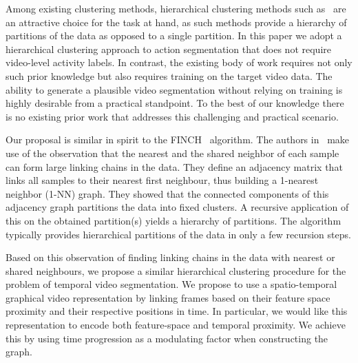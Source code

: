 \documentclass[10pt,twocolumn,letterpaper]{article}
\begin{document}
Among existing clustering methods, hierarchical clustering methods such as~\cite{finch} are an attractive choice for the task at hand, as such methods provide a hierarchy of partitions of the data as opposed to a single partition. In this paper we adopt a hierarchical clustering approach to action segmentation that does not require video-level activity labels.
In contrast, the existing body of work requires not only such prior knowledge but also requires training on the target video data.
The ability to generate a plausible video segmentation without relying on training is highly desirable from a practical standpoint.
To the best of our knowledge there is no existing prior work that addresses this challenging and practical scenario.
\begin{table}[t!]
\centering
{}
\caption{Simple clustering with Kmeans or FINCH is competitive with the best reported weakly or unsupervised methods. \label{table:baseclustering}}
\vspace{-0.3cm}
\end{table}

Our proposal is similar in spirit to the FINCH~\cite{finch} algorithm. The authors in~\cite{finch} make use of the observation that the nearest and the shared neighbor of each sample can form large linking chains in the data. They define an adjacency matrix that links all samples to their nearest first neighbour, thus building a 1-nearest neighbor (1-NN) graph. They showed that the connected components of this adjacency graph partitions the data into fixed clusters. A recursive application of this on the obtained partition(s) yields a hierarchy of partitions. The algorithm typically provides hierarchical partitions of the data in only a few recursion steps.

Based on this observation of finding linking chains in the data with nearest or shared neighbours, we propose a similar hierarchical clustering procedure for the problem of temporal video segmentation. 
We propose to use a spatio-temporal graphical video representation by linking frames based on their feature space proximity and their respective positions in time.
In particular, we would like this representation to encode both feature-space and temporal proximity.
We achieve this by using time progression as a modulating factor when constructing the graph.
\end{document}
